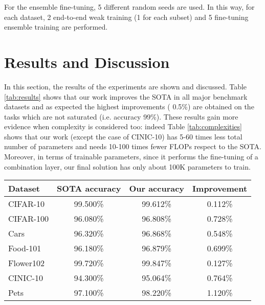 \documentclass[review]{elsarticle}
\newcommand{\rev}[1]{\added[id=R1]{#1}}
\newcommand{\del}[1]{\deleted[id=R1]{#1}}
\begin{document}
For the ensemble fine-tuning, 5 different random seeds are used.
In this way, for each dataset, 2 end-to-end weak training (1 for each subset) and 5 fine-tuning ensemble training are performed.

\section{Results and Discussion}
In this section, the results of the experiments are shown and  discussed. Table \ref{tab:results} shows that our work improves the SOTA in all major benchmark datasets and as expected the highest improvements ( 0.5\%) are obtained on the tasks which are not saturated (i.e. accuracy  99\%). These results gain more evidence when complexity is considered too: indeed Table \ref{tab:complexities} shows that our work (except \del{for}\rev{in} the case of CINIC-10) has 5-60 times less total number of parameters and needs 10-100 times fewer FLOPs respect to the SOTA. Moreover, in terms of trainable parameters, since it performs the fine-tuning of a combination layer, our final solution has only about 100K parameters to train.

\begin{table*}[h]
\caption{Classification test accuracy comparison between SOTA and our work on datasets used during experiments.}
\newcommand\T{\rule{0pt}{2.5ex}}
\begin{center}
\begin{tabular}{lccc}
{\bf Dataset} &  {\bf SOTA accuracy} & {\bf Our accuracy}  & {\bf Improvement}\\
    \hline
    \T
    CIFAR-10 \cite{vith14} & 99.500\% & 99.612\% & 0.112\%\\
    CIFAR-100 \cite{SAM} & 96.080\% & 96.808\% & 0.728\%\\
    Cars \cite{tresentlv2} & 96.320\% & 96.868\% & 0.548\%\\
    Food-101 \cite{SAM} & 96.180\% & 96.879\% & 0.699\%\\
    Flower102 \cite{cvt24} & 99.720\% & 99.847\% & 0.127\%\\
    CINIC-10 \cite{NATm3} & 94.300\% & 95.064\% & 0.764\%\\
    Pets \cite{SAM} & 97.100\% & 98.220\% & 1.120\%
\end{tabular}
\end{center}
\label{tab:results}
\end{table*}
\end{document}
